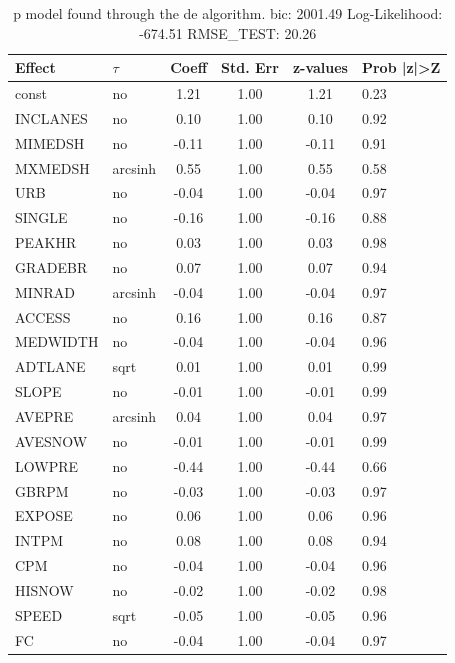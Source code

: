 \begin{table}
	\caption{p model found through the de algorithm. bic: 2001.49 Log-Likelihood: -674.51 RMSE_TEST: 20.26}
	\begin{center}
		\begin{tabular}{|l|l|c|c|c|l|}
			\hline
			Effect & $\tau$ & Coeff & Std. Err & z-values & Prob |z|>Z \\
			\hline
			const & no & 1.21 & 1.00 & 1.21 & 0.23 \\
			\hline
			INCLANES & no & 0.10 & 1.00 & 0.10 & 0.92 \\
			\hline
			MIMEDSH & no & -0.11 & 1.00 & -0.11 & 0.91 \\
			\hline
			MXMEDSH & arcsinh & 0.55 & 1.00 & 0.55 & 0.58 \\
			\hline
			URB & no & -0.04 & 1.00 & -0.04 & 0.97 \\
			\hline
			SINGLE & no & -0.16 & 1.00 & -0.16 & 0.88 \\
			\hline
			PEAKHR & no & 0.03 & 1.00 & 0.03 & 0.98 \\
			\hline
			GRADEBR & no & 0.07 & 1.00 & 0.07 & 0.94 \\
			\hline
			MINRAD & arcsinh & -0.04 & 1.00 & -0.04 & 0.97 \\
			\hline
			ACCESS & no & 0.16 & 1.00 & 0.16 & 0.87 \\
			\hline
			MEDWIDTH & no & -0.04 & 1.00 & -0.04 & 0.96 \\
			\hline
			ADTLANE & sqrt & 0.01 & 1.00 & 0.01 & 0.99 \\
			\hline
			SLOPE & no & -0.01 & 1.00 & -0.01 & 0.99 \\
			\hline
			AVEPRE & arcsinh & 0.04 & 1.00 & 0.04 & 0.97 \\
			\hline
			AVESNOW & no & -0.01 & 1.00 & -0.01 & 0.99 \\
			\hline
			LOWPRE & no & -0.44 & 1.00 & -0.44 & 0.66 \\
			\hline
			GBRPM & no & -0.03 & 1.00 & -0.03 & 0.97 \\
			\hline
			EXPOSE & no & 0.06 & 1.00 & 0.06 & 0.96 \\
			\hline
			INTPM & no & 0.08 & 1.00 & 0.08 & 0.94 \\
			\hline
			CPM & no & -0.04 & 1.00 & -0.04 & 0.96 \\
			\hline
			HISNOW & no & -0.02 & 1.00 & -0.02 & 0.98 \\
			\hline
			SPEED & sqrt & -0.05 & 1.00 & -0.05 & 0.96 \\
			\hline
			FC & no & -0.04 & 1.00 & -0.04 & 0.97 \\

\end{tabular}
\end{center}
\end{table}
